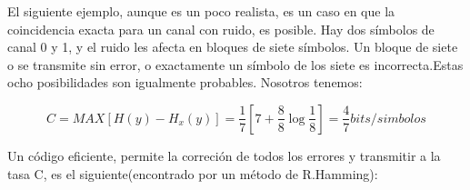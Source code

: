 \documentclass{article}
\begin{document}

El siguiente ejemplo, aunque es un poco realista, es un caso en que la coincidencia exacta para un canal con ruido, 
es posible. Hay dos s\'imbolos de canal 0 y 1, y el ruido les afecta en bloques de siete s\'imbolos. 
Un bloque de siete o se transmite sin error, o exactamente un s\'imbolo de los siete es incorrecta.Estas 
ocho posibilidades son igualmente probables. Nosotros tenemos:

\begin{equation}
C = MAX[ H(y) - H_x(y) ]
= \frac{1}{7}[7 + \frac{8}{8}\log{\frac{1}{8}}]
= \frac{4}{7} bits/simbolos
\end{equation}
 
Un c\'odigo eficiente, permite la correci\'on de todos los errores y transmitir a la tasa C, es el 
siguiente(encontrado por un m\'etodo de R.Hamming):
\end{document}
